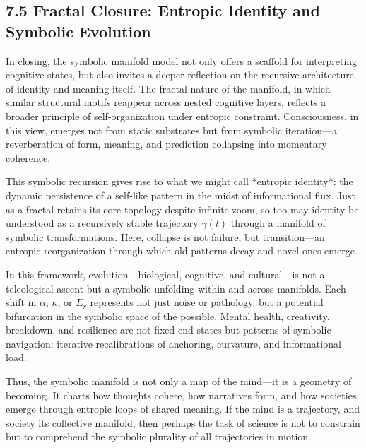\subsection*{7.5 Fractal Closure: Entropic Identity and Symbolic Evolution}

In closing, the symbolic manifold model not only offers a scaffold for interpreting cognitive states, but also invites a deeper reflection on the recursive architecture of identity and meaning itself. The fractal nature of the manifold, in which similar structural motifs reappear across nested cognitive layers, reflects a broader principle of self-organization under entropic constraint. Consciousness, in this view, emerges not from static substrates but from symbolic iteration—a reverberation of form, meaning, and prediction collapsing into momentary coherence.

This symbolic recursion gives rise to what we might call *entropic identity*: the dynamic persistence of a self-like pattern in the midst of informational flux. Just as a fractal retains its core topology despite infinite zoom, so too may identity be understood as a recursively stable trajectory $\gamma(t)$ through a manifold of symbolic transformations. Here, collapse is not failure, but transition—an entropic reorganization through which old patterns decay and novel ones emerge.

In this framework, evolution—biological, cognitive, and cultural—is not a teleological ascent but a symbolic unfolding within and across manifolds. Each shift in $\alpha$, $\kappa$, or $E_r$ represents not just noise or pathology, but a potential bifurcation in the symbolic space of the possible. Mental health, creativity, breakdown, and resilience are not fixed end states but patterns of symbolic navigation: iterative recalibrations of anchoring, curvature, and informational load.

Thus, the symbolic manifold is not only a map of the mind—it is a geometry of becoming. It charts how thoughts cohere, how narratives form, and how societies emerge through entropic loops of shared meaning. If the mind is a trajectory, and society its collective manifold, then perhaps the task of science is not to constrain but to comprehend the symbolic plurality of all trajectories in motion.